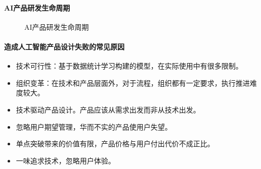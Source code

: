\documentclass[letterpaper,10pt,english]{sphinxmanual}
\begin{document}
\paragraph{AI产品研发生命周期}
\label{\detokenize{chapter_introduction/AI_Product:id14}}
\begin{figure}[H]
\centering
\capstart

\noindent{}
\caption{AI产品研发生命周期\sphinxfootnotemark[250]}\label{\detokenize{chapter_introduction/AI_Product:id24}}\end{figure}
%
\begin{footnotetext}[250]\sphinxAtStartFootnote
{}
%
\end{footnotetext}\ignorespaces 

\paragraph{造成人工智能产品设计失败的常见原因}
\label{\detokenize{chapter_introduction/AI_Product:id15}}\begin{itemize}
\item {} 
技术可行性：基于数据统计学习构建的模型，在实际使用中有很多限制。

\item {} 
组织变革：在技术和产品层面外，对于流程，组织都有一定要求，执行推进难度较大。%
\begin{footnote}[251]\sphinxAtStartFootnote
{}
%
\end{footnote}

\item {} 
技术驱动产品设计。产品应该从需求出发而非从技术出发。

\item {} 
忽略用户期望管理，华而不实的产品使用户失望。

\item {} 
单点突破带来的价值有限，产品价格与用户付出代价不成正比。

\item {} 
一味追求技术，忽略用户体验。 %
\begin{footnote}[252]\sphinxAtStartFootnote
{}
%
\end{footnote}

\end{itemize}
\end{document}
